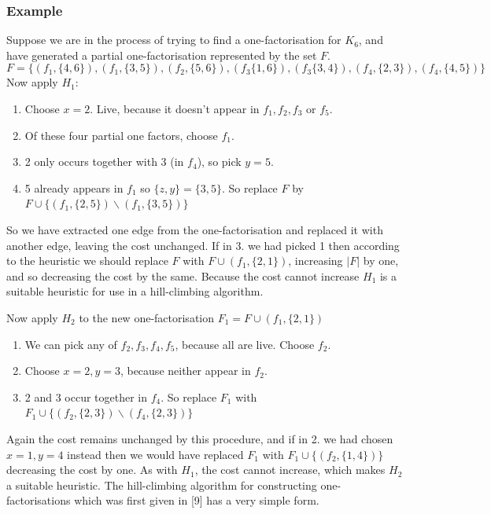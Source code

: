 \documentclass[
  12pt,
  a4paper]{book}
\begin{document}
\hypertarget{example-1}{%
\subsubsection{Example}\label{example-1}}

Suppose we are in the process of trying to find a one-factorisation for
\(K_6\), and have generated a partial one-factorisation represented by
the set \(F\).
\[F=\{(f_1,\{4,6\}),(f_1,\{3,5\}),(f_2,\{5,6\}),(f_3\{1,6\}), (f_3\{3,4\}),(f_4,\{2,3\}),(f_4,\{4,5\})\}\]
Now apply \(H_1\):

\begin{enumerate}
\def\labelenumi{\arabic{enumi}.}
\item
  Choose \(x=2\). Live, because it doesn't appear in \(f_1,f_2,f_3\) or
  \(f_5\).
\item
  Of these four partial one factors, choose \(f_1\).
\item
  2 only occurs together with 3 (in \(f_4\)), so pick \(y=5\).
\item
  5 already appears in \(f_1\) so \(\{z,y\}=\{3,5\}\). So replace \(F\)
  by \(F \cup \{(f_1,\{2,5\}) \backslash (f_1,\{3,5\})\}\)
\end{enumerate}

So we have extracted one edge from the one-factorisation and replaced it
with another edge, leaving the cost unchanged. If in 3. we had picked 1
then according to the heuristic we should replace \(F\) with
\(F \cup (f_1,\{2,1\})\), increasing \(|F|\) by one, and so decreasing
the cost by the same. Because the cost cannot increase \(H_1\) is a
suitable heuristic for use in a hill-climbing algorithm.

Now apply \(H_2\) to the new one-factorisation
\(F_1=F \cup (f_1,\{2,1\})\)

\begin{enumerate}
\def\labelenumi{\arabic{enumi}.}
\item
  We can pick any of \(f_2, f_3, f_4, f_5\), because all are live.
  Choose \(f_2\).
\item
  Choose \(x=2, y=3\), because neither appear in \(f_2\).
\item
  2 and 3 occur together in \(f_4\). So replace \(F_1\) with
  \(F_1 \cup \{(f_2,\{2,3\}) \backslash (f_4,\{2,3\})\}\)
\end{enumerate}

Again the cost remains unchanged by this procedure, and if in 2. we had
chosen \(x=1,y=4\) instead then we would have replaced \(F_1\) with
\(F_1 \cup \{(f_2,\{1,4\})\}\) decreasing the cost by one. As with
\(H_1\), the cost cannot increase, which makes \(H_2\) a suitable
heuristic. The hill-climbing algorithm for constructing
one-factorisations which was first given in {[}9{]} has a very simple
form.
\end{document}
